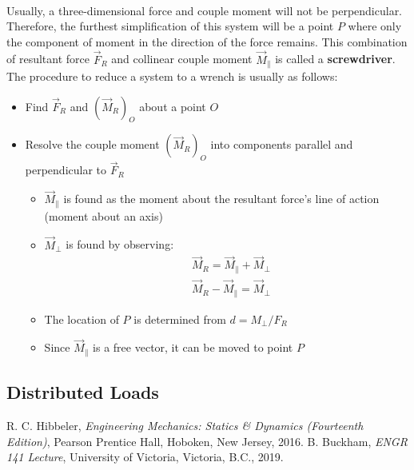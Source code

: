 \documentclass[12pt]{article}
\begin{document}
\paragraph{}
Usually, a three-dimensional force and couple moment will not be perpendicular.
Therefore, the furthest simplification of this system will be a point $P$ where only the component of moment in the direction of the force remains.
This combination of resultant force $\vec{F}_R$ and collinear couple moment $\vec{M}_{\parallel}$ is called a \textbf{screwdriver}.
The procedure to reduce a system to a wrench is usually as follows:
\begin{itemize}
    \item Find $\vec{F}_R$ and $(\vec{M}_R)_O$ about a point $O$
    \item Resolve the couple moment $(\vec{M}_R)_O$ into components parallel and perpendicular to $\vec{F}_R$
    \begin{itemize}
        \item $\vec{M}_{\parallel}$ is found as the moment about the resultant force's line of action (moment about an axis)
        \item $\vec{M}_{\perp}$ is found by observing:
            \begin{align*}
                & \vec{M}_R = \vec{M}_{\parallel} + \vec{M}_{\perp} \\
                & \vec{M}_R - \vec{M}_{\parallel} = \vec{M}_{\perp}
            \end{align*}
        \item The location of $P$ is determined from $d = M_{\perp}/F_R$
        \item Since $\vec{M}_{\parallel}$ is a free vector, it can be moved to point $P$
    \end{itemize}
\end{itemize}

\subsection{Distributed Loads}



\pagebreak
{}
\begin{thebibliography}{2}
    R. C. Hibbeler, \textit{Engineering Mechanics: Statics \& Dynamics (Fourteenth Edition)}, Pearson Prentice Hall, Hoboken, New Jersey, 2016.
    B. Buckham, \textit{ENGR 141 Lecture}, University of Victoria, Victoria, B.C., 2019.
\end{thebibliography}
\end{document}
